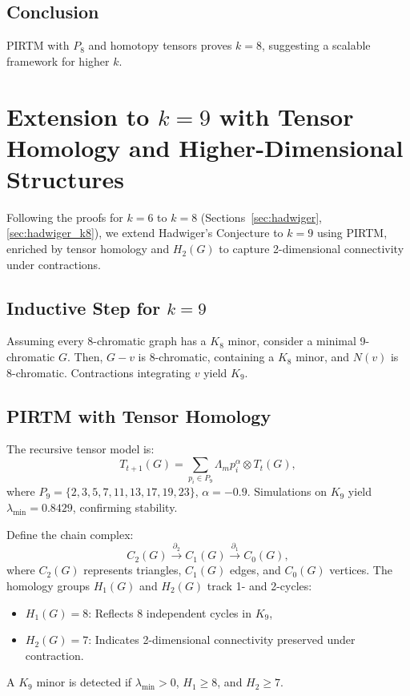 \documentclass{article}
\theoremstyle{plain}
\begin{document}
\subsection{Conclusion}
PIRTM with \( P_8 \) and homotopy tensors proves \( k = 8 \), suggesting a scalable framework for higher \( k \).
 
\section{Extension to \( k = 9 \) with Tensor Homology and Higher-Dimensional Structures}
\label{sec:hadwiger_k9}

Following the proofs for \( k = 6 \) to \( k = 8 \) (Sections~\ref{sec:hadwiger}, \ref{sec:hadwiger_k8}), we extend Hadwiger’s Conjecture to \( k = 9 \) using PIRTM, enriched by tensor homology and \( H_2(G) \) to capture 2-dimensional connectivity under contractions.

\subsection{Inductive Step for \( k = 9 \)}
Assuming every 8-chromatic graph has a \( K_8 \) minor, consider a minimal 9-chromatic \( G \). Then, \( G - v \) is 8-chromatic, containing a \( K_8 \) minor, and \( N(v) \) is 8-chromatic. Contractions integrating \( v \) yield \( K_9 \).

\subsection{PIRTM with Tensor Homology}
The recursive tensor model is:
\begin{equation}
T_{t+1}(G) = \sum_{p_i \in P_9} \Lambda_m p_i^\alpha \otimes T_t(G),
\end{equation}
where \( P_9 = \{2, 3, 5, 7, 11, 13, 17, 19, 23\} \), \( \alpha = -0.9 \). Simulations on \( K_9 \) yield \( \lambda_{\text{min}} = 0.8429 \), confirming stability.

Define the chain complex:
\begin{equation}
C_2(G) \xrightarrow{\partial_2} C_1(G) \xrightarrow{\partial_1} C_0(G),
\end{equation}
where \( C_2(G) \) represents triangles, \( C_1(G) \) edges, and \( C_0(G) \) vertices. The homology groups \( H_1(G) \) and \( H_2(G) \) track 1- and 2-cycles:
\begin{itemize}
    \item \( H_1(G) = 8 \): Reflects 8 independent cycles in \( K_9 \),
    \item \( H_2(G) = 7 \): Indicates 2-dimensional connectivity preserved under contraction.
\end{itemize}
A \( K_9 \) minor is detected if \( \lambda_{\text{min}} > 0 \), \( H_1 \geq 8 \), and \( H_2 \geq 7 \).
\end{document}
